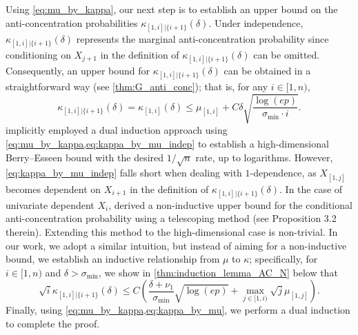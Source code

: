 \documentclass[aos]{imsart}
\begin{document}
Using \cref{eq:mu_by_kappa}, our next step is to establish an upper bound on the anti-concentration probabilities $\kappa_{[1,i]|\{i+1\}}(\delta)$. Under independence, $\kappa_{[1,i]|\{i+1\}}(\delta)$ represents the marginal anti-concentration probability since conditioning on $X_{j+1}$ in the definition of $\kappa_{[1,i]|\{i+1\}}(\delta)$ can be omitted. Consequently, an upper bound for $\kappa_{[1,i]|\{i+1\}}(\delta)$ can be obtained in a straightforward way (see \cref{thm:G_anti_conc}); that is, for any $i \in [1,n)$,
\begin{equation} \label{eq:kappa_by_mu_indep}
    \kappa_{[1,i]|\{i+1\}}(\delta) = \kappa_{[1,i]}(\delta) \leq \mu_{[1,i]} + C \delta \sqrt{\frac{\log(ep)}{\sigma_{\min} \cdot i}}.
\end{equation}  implicitly employed a dual induction approach using \cref{eq:mu_by_kappa,eq:kappa_by_mu_indep} to establish a high-dimensional Berry--Esseen bound with the desired $1/\sqrt{n}$ rate, up to logarithms. However, \cref{eq:kappa_by_mu_indep} falls short when dealing with $1$-dependence, as $X_{[1,j]}$ becomes dependent on $X_{i+1}$ in the definition of $\kappa_{[1,i]|\{i+1\}}(\delta)$.
In the case of univariate dependent $X_i$, \citet{chen2004normal} derived a non-inductive upper bound for the conditional anti-concentration probability using a telescoping method (see Proposition 3.2 therein). Extending this method to the high-dimensional case is non-trivial. In our work, we adopt a similar intuition, but instead of aiming for a non-inductive bound, we establish an inductive relationship from $\mu$ to $\kappa$; specifically, for $i \in [1,n)$ and $\delta > \sigma_{\min}$, we show in \cref{thm:induction_lemma_AC_N} below that
\begin{equation} \label{eq:kappa_by_mu}
    \sqrt{i}\kappa_{[1,i]|\{i+1\}}(\delta) \leq C \left( \frac{\delta + \nu_1}{\sigma_{\min}} \sqrt{\log(ep)} + \max_{j \in [1,i)} \sqrt{j} \mu_{[1,j]} \right).
\end{equation}
Finally, using \cref{eq:mu_by_kappa,eq:kappa_by_mu}, we perform a dual induction to complete the proof.

\end{document}
